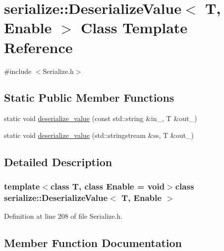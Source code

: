 \hypertarget{classserialize_1_1_deserialize_value}{}\section{serialize\+:\+:Deserialize\+Value$<$ T, Enable $>$ Class Template Reference}
\label{classserialize_1_1_deserialize_value}


{\ttfamily \#include $<$Serialize.\+h$>$}

\subsection*{Static Public Member Functions}
\begin{DoxyCompactItemize}
\item 
static void \hyperlink{classserialize_1_1_deserialize_value_ae086cfe3996b96c0a82785afe0af81b1}{deserialize\+\_\+value} (const std\+::string \&in\+\_\+, T \&out\+\_\+)
\item 
static void \hyperlink{classserialize_1_1_deserialize_value_a85960dc8ca3587ca9c275c0deb679bb7}{deserialize\+\_\+value} (std\+::stringstream \&ss, T \&out\+\_\+)
\end{DoxyCompactItemize}


\subsection{Detailed Description}
\subsubsection*{template$<$class T, class Enable = void$>$class serialize\+::\+Deserialize\+Value$<$ T, Enable $>$}



Definition at line 208 of file Serialize.\+h.



\subsection{Member Function Documentation}
\hypertarget{classserialize_1_1_deserialize_value_ae086cfe3996b96c0a82785afe0af81b1}{}
